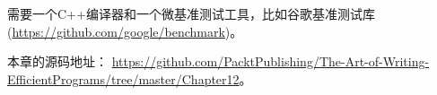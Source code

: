 需要一个C++编译器和一个微基准测试工具，比如谷歌基准测试库(\url{https://github.com/google/benchmark})。

本章的源码地址： \url{https://github.com/PacktPublishing/The-Art-of-Writing-EfficientPrograms/tree/master/Chapter12}。